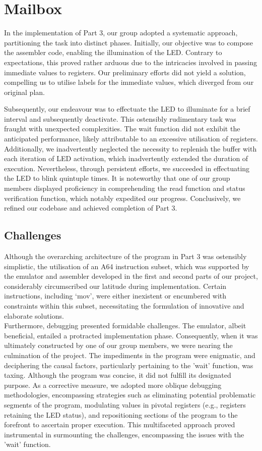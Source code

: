 \documentclass[11pt]{article}
\begin{document}
\section{Mailbox}
In the implementation of Part 3, our group adopted a systematic approach, partitioning the task into distinct phases. Initially, our objective was to compose the assembler code, enabling the illumination of the LED. Contrary to expectations, this proved rather arduous due to the intricacies involved in passing immediate values to registers. Our preliminary efforts did not yield a solution, compelling us to utilise labels for the immediate values, which diverged from our original plan.

Subsequently, our endeavour was to effectuate the LED to illuminate for a brief interval and subsequently deactivate. This ostensibly rudimentary task was fraught with unexpected complexities. The wait function did not exhibit the anticipated performance, likely attributable to an excessive utilisation of registers. Additionally, we inadvertently neglected the necessity to replenish the buffer with each iteration of LED activation, which inadvertently extended the duration of execution. Nevertheless, through persistent efforts, we succeeded in effectuating the LED to blink quintuple times. It is noteworthy that one of our group members displayed proficiency in comprehending the read function and status verification function, which notably expedited our progress. Conclusively, we refined our codebase and achieved completion of Part 3.

\subsection{Challenges}
Although the overarching architecture of the program in Part 3 was ostensibly simplistic, the utilisation of an A64 instruction subset, which was supported by the emulator and assembler developed in the first and second parts of our project, considerably circumscribed our latitude during implementation. Certain instructions, including ‘mov’, were either inexistent or encumbered with constraints within this subset, necessitating the formulation of innovative and elaborate solutions. \\

Furthermore, debugging presented formidable challenges. The emulator, albeit beneficial, entailed a protracted implementation phase. Consequently, when it was ultimately constructed by one of our group members, we were nearing the culmination of the project. The impediments in the program were enigmatic, and deciphering the causal factors, particularly pertaining to the 'wait' function, was taxing. Although the program was concise, it did not fulfill its designated purpose. As a corrective measure, we adopted more oblique debugging methodologies, encompassing strategies such as eliminating potential problematic segments of the program, modulating values in pivotal registers (e.g., registers retaining the LED status), and repositioning sections of the program to the forefront to ascertain proper execution. This multifaceted approach proved instrumental in surmounting the challenges, encompassing the issues with the 'wait' function.
\end{document}
